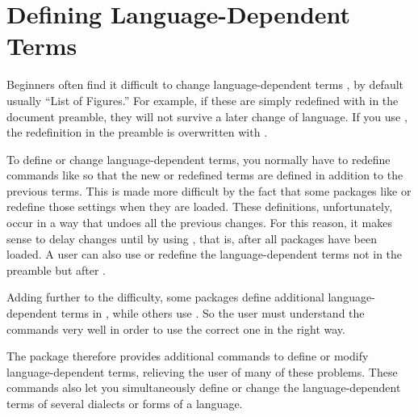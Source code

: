 \section{Defining Language-Dependent Terms}
\BeginIndexGroup
{}

Beginners often find it difficult to change language-dependent terms
, by default usually ``List of
Figures.'' For example, if these are simply redefined with
 in the document preamble, they will not survive a later
change of language. If you use , the
redefinition in the preamble is overwritten with
.

To define or change language-dependent terms, you normally have to redefine
commands like  so that the new or redefined terms are
defined in addition to the previous terms. This is made more difficult by the
fact that some packages like  or
 redefine those settings when they are
loaded. These definitions, unfortunately, occur in a way that undoes all the
previous changes. For this reason, it makes sense to delay changes until
 by using , that is,
after all packages have been loaded. A user can also use
 or redefine the language-dependent terms not in the
preamble but after .

Adding further to the difficulty, some packages define additional
language-dependent terms in , while others use
. So the user must understand the commands very
well in order to use the correct one in the right way.

The  package therefore provides additional commands to define
or modify language-dependent terms, relieving the user of many of these
problems. These commands also let you simultaneously define or change the
language-dependent terms of several dialects or forms of a language.

